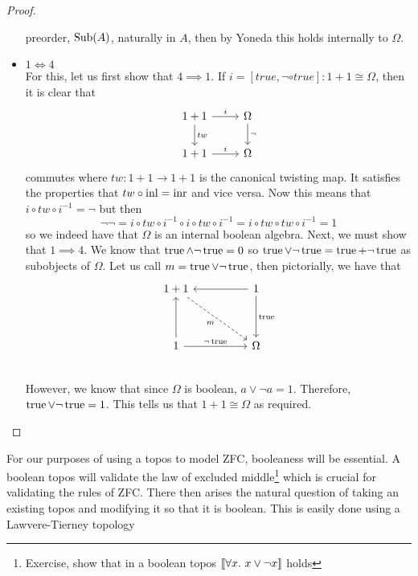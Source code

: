 \begin{proof}
\begin{itemize}
    preorder, $\operatorname{Sub}(A)$, naturally in $A$, then by Yoneda this holds
    internally to $\Omega$.
  \item $1 \iff 4$\\
    For this, let us first show that $4 \implies 1$. If
    $i = [true, \neg \circ true] : 1 + 1 \cong \Omega$, then it is clear
    that
    \[
      \begin{tikzcd}
        1 + 1 \ar[r, "i"] \ar[d, "tw"] & \Omega \ar[d, "\neg"] \\
        1 + 1 \ar[r, "i"] & \Omega
      \end{tikzcd}
    \]
    commutes where $tw : 1 + 1 \to 1 + 1$ is the canonical twisting
    map. It satisfies the properties that $tw \circ \operatorname{inl} = \operatorname{inr}$ and
    vice versa. Now this means that $i \circ tw \circ i^{-1} = \neg$
    but then
    \[
      \neg\neg = i \circ tw \circ i^{-1} \circ i \circ tw \circ i^{-1} =
      i \circ tw \circ tw \circ i^{-1} = 1
    \]
    so we indeed have that $\Omega$ is an internal boolean
    algebra. Next, we must show that $1 \implies 4$. We know that
    $\operatorname{true} \wedge \neg \operatorname{true} = 0$ so
    $\operatorname{true} \vee \neg \operatorname{true} = \operatorname{true} + \neg \operatorname{true}$ as subobjects of
    $\Omega$. Let us call $m = \operatorname{true} \vee \neg \operatorname{true}$, then
    pictorially, we have that
    \[
      \begin{tikzcd}
        1 + 1 \ar[ddrr, dashed, swap, "m"] & &
        1 \ar[dd, "\true"] \ar[ll]\\
        &&\\
        1 \ar[rr, "\neg \true"] \ar[uu] & & \Omega\\
      \end{tikzcd}
    \]
    However, we know that since $\Omega$ is boolean,
    $a \vee \neg a = 1$. Therefore, $\operatorname{true} \vee \neg \operatorname{true} = 1$. This
    tells us that $1 + 1 \cong \Omega$ as required.
  \end{itemize}
\end{proof}

For our purposes of using a topos to model ZFC, booleaness will be
essential. A boolean topos will validate the law of excluded
middle\footnote{Exercise, show that in a boolean topos
  $\llbracket \forall x.\ x \vee \neg x \rrbracket$ holds} which is crucial for
validating the rules of ZFC. There then arises the natural question of
taking an existing topos and modifying it so that it is boolean. This
is easily done using a Lawvere-Tierney topology

